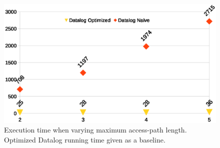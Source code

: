 \begin{figure}[h]
  \begin{minipage}[b]{\linewidth}
    \centering
    \includegraphics[clip,width=\linewidth]{assets/must-data/length.eps}
  \end{minipage}
  \caption{Execution time when varying maximum access-path length. Optimized
    Datalog running time given as a baseline.}
    \label{fig:aplength}
\end{figure}





